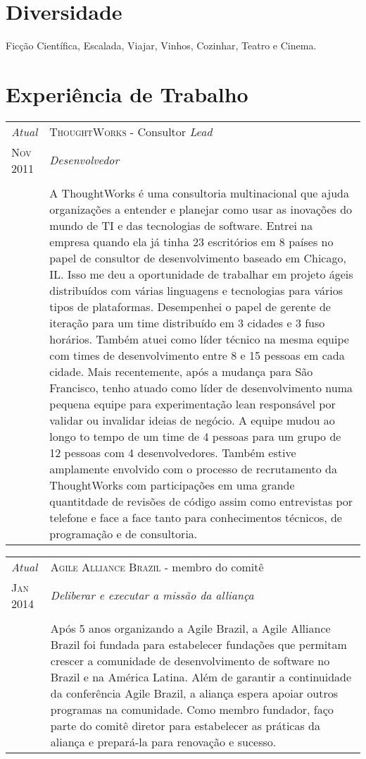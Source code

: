 \documentclass[letter,10pt]{article}
\begin{document}
\section{Diversidade}

Ficção Científica, Escalada, Viajar, Vinhos, Cozinhar, Teatro e Cinema.

\section{Experiência de Trabalho}

\begin{tabular}{p{2.5cm}|p{13.5cm}}
  \emph{Atual} & \textsc{ThoughtWorks} - Consultor \textit{Lead}\\
  \textsc{Nov 2011}& \emph{Desenvolvedor}\\
  &\\
  &A ThoughtWorks é uma consultoria multinacional que ajuda organizações a entender e planejar como usar as inovações do mundo de TI e das tecnologias de software. Entrei na empresa quando ela já tinha 23 escritórios em 8 países no papel de consultor de desenvolvimento baseado em Chicago, IL. Isso me deu a oportunidade de trabalhar em projeto ágeis distribuídos com várias linguagens e tecnologias para vários tipos de plataformas. Desempenhei o papel de gerente de iteração para um time distribuído em 3 cidades e 3 fuso horários. Também atuei como líder técnico na mesma equipe com times de desenvolvimento entre 8 e 15 pessoas em cada cidade. Mais recentemente, após a mudança para São Francisco, tenho atuado como líder de desenvolvimento numa pequena equipe para experimentação lean responsável por validar ou invalidar ideias de negócio. A equipe mudou ao longo to tempo de um time de 4 pessoas para um grupo de 12 pessoas com 4 desenvolvedores. Também estive amplamente envolvido com o processo de recrutamento da ThoughtWorks com participações em uma grande quantitdade de revisões de código assim como entrevistas por telefone e face a face tanto para conhecimentos técnicos, de programação e de consultoria.
\end{tabular}

\begin{tabular}{p{2.5cm}|p{13.5cm}}
  \emph{Atual} & \textsc{Agile Alliance Brazil} - membro do comitê\\
  \textsc{Jan 2014}& \emph{Deliberar e executar a missão da alliança}\\
  &\\
  & Após 5 anos organizando a Agile Brazil, a Agile Alliance Brazil foi
  fundada para estabelecer fundações que permitam crescer a comunidade
  de desenvolvimento de software no Brazil e na América Latina. Além de
  garantir a continuidade da conferência Agile Brazil, a aliança espera
  apoiar outros programas na comunidade. Como membro fundador, faço parte
  do comitê diretor para estabelecer as práticas da aliança e prepará-la
  para renovação e sucesso.
\end{tabular}
\end{document}
